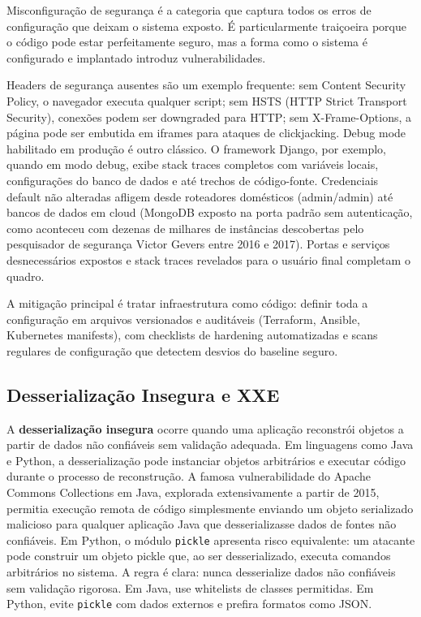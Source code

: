 Misconfiguração de segurança é a categoria que captura todos os erros de
configuração que deixam o sistema exposto. É particularmente traiçoeira porque
o código pode estar perfeitamente seguro, mas a forma como o sistema é
configurado e implantado introduz vulnerabilidades.

Headers de segurança ausentes são um exemplo frequente: sem Content Security
Policy, o navegador executa qualquer script; sem HSTS (HTTP Strict Transport
Security), conexões podem ser downgraded para HTTP; sem X-Frame-Options,
a página pode ser embutida em iframes para ataques de clickjacking. Debug mode
habilitado em produção é outro clássico. O framework Django, por exemplo,
quando em modo debug, exibe stack traces completos com variáveis locais,
configurações do banco de dados e até trechos de código-fonte. Credenciais
default não alteradas afligem desde roteadores domésticos (admin/admin) até
bancos de dados em cloud (MongoDB exposto na porta padrão sem autenticação,
como aconteceu com dezenas de milhares de instâncias descobertas pelo pesquisador
de segurança Victor Gevers entre 2016 e 2017). Portas e serviços desnecessários
expostos e stack traces revelados para o usuário final completam o quadro.

A mitigação principal é tratar infraestrutura como código: definir toda a
configuração em arquivos versionados e auditáveis (Terraform, Ansible,
Kubernetes manifests), com checklists de hardening automatizadas e scans
regulares de configuração que detectem desvios do baseline seguro.

\subsection{Desserialização Insegura e XXE}

A \textbf{desserialização insegura} ocorre quando uma aplicação reconstrói
objetos a partir de dados não confiáveis sem validação adequada. Em linguagens
como Java e Python, a desserialização pode instanciar objetos arbitrários e
executar código durante o processo de reconstrução. A famosa vulnerabilidade do
Apache Commons Collections em Java, explorada extensivamente a partir de 2015,
permitia execução remota de código simplesmente enviando um objeto serializado
malicioso para qualquer aplicação Java que desserializasse dados de fontes não
confiáveis. Em Python, o módulo \texttt{pickle} apresenta risco equivalente: um
atacante pode construir um objeto pickle que, ao ser desserializado, executa
comandos arbitrários no sistema. A regra é clara: nunca desserialize dados não
confiáveis sem validação rigorosa. Em Java, use whitelists de classes permitidas.
Em Python, evite \texttt{pickle} com dados externos e prefira formatos como JSON.

